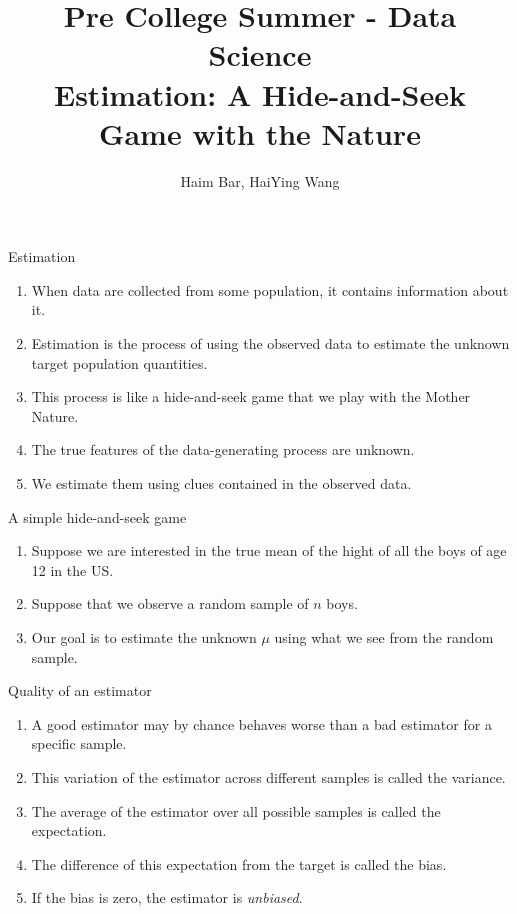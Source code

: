 \documentclass[serif,envcountsect,table,t,handout]{beamer}%
\begin{document}
\title[Estimation]{Pre College Summer - Data Science\\
Estimation: A Hide-and-Seek Game with the Nature}
\author[Bar, Wang]{Haim Bar, HaiYing Wang}
\date[]{}
\begin{frame}[noframenumbering] \titlepage \end{frame}
\begin{frame}{Estimation}
  \begin{enumerate}
  \item When data are collected from some population, it contains information
    about it.
\item Estimation is the process of
using the observed data to estimate the unknown target population
quantities.
\item This process is like a hide-and-seek game that we play with the
Mother Nature.
\item The true features of the data-generating process are unknown.
\item We
estimate them using clues contained in the observed data.
  \end{enumerate}
\end{frame}
\begin{frame}{A simple hide-and-seek game}
  \begin{enumerate}
  \item Suppose we are interested in the true mean of the hight of all the boys of age
    12 in the US.
  \item Suppose that we observe a random sample of $n$ boys.
\item Our goal is to estimate the unknown
 $\mu$ using what we see from the random sample.

  \end{enumerate}
\end{frame}
\begin{frame}{Quality of an estimator}
  \begin{enumerate}
  \item A good estimator may by chance behaves worse than a bad estimator for a specific sample.
\item This variation of the estimator across different samples is called the
  variance.
\item The average of the estimator over all possible samples is called the
  expectation.
\item The difference of this expectation from the target is called the bias.
\item If the bias is zero, the estimator is \emph{unbiased}.
  \end{enumerate}
\end{frame}
\end{document}
